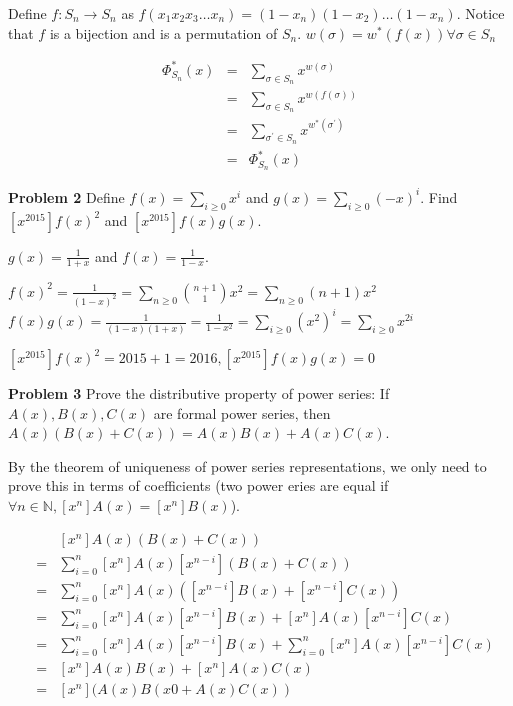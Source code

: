 \documentclass{article}
\newcommand{\func}[3][f]{$#1: #2 \rightarrow #3$}
\begin{document}
\begin{enumerate}[a)]
	Define \func{S_n}{S_n} as $f(x_1x_2x_3 \dots x_n) = (1-x_n)(1-x_2) \dots (1-x_n)$. Notice that $f$ is a bijection and is a permutation of $S_n$. $w(\sigma) = w^*(f(x)) \forall \sigma \in S_n$
	
	\begin{eqnarray*}
		\Phi_{S_n}^*(x) & = & \sum_{\sigma \in S_n}x^{w(\sigma)} \\
		& = & \sum_{\sigma \in S_n}x^{w(f(\sigma))} \\
		& = & \sum_{\sigma^\prime \in S_n}x^{w^*(\sigma^\prime)} \\
		& = & \Phi_{S_n}^*(x)
	\end{eqnarray*}
		
\end{enumerate}

\textbf{Problem 2}
Define $f(x) = \sum_{i \ge 0}x^i$ and $g(x) = \sum_{i \ge 0} (-x)^i$. Find $[x^{2015}]f(x)^2$ and $[x^{2015}]f(x)g(x)$.

$g(x) = \frac{1}{1 + x}$ and $f(x) = \frac{1}{1-x}$. 

$f(x)^2 = \frac{1}{(1-x)^2} = \sum_{n \ge 0} \binom {n+1}1 x^2 = \sum_{n \ge 0} (n+1)x^2$\\
$f(x)g(x) = \frac{1}{(1-x)(1+x)} = \frac{1}{1 - x^2} = \sum_{i \ge 0}(x^2)^i = \sum_{i \ge 0} x ^{2i}$

$[x^{2015}]f(x)^2 = 2015 + 1 = 2016, [x^{2015}]f(x)g(x) = 0$


\textbf{Problem 3}
Prove the distributive property of power series: If $A(x), B(x), C(x)$ are formal power series, then $A(x)(B(x) + C(x)) = A(x)B(x) + A(x)C(x)$.

By the theorem of uniqueness of power series representations, we only need to prove this in terms of coefficients (two power eries are equal if $\forall n \in \mathbb{N}, [x^n]A(x) = [x^n]B(x)$).

\begin{eqnarray*}
	& &[x^n]A(x)(B(x) + C(x))\\
	& = & \sum_{i = 0}^{n} [x^n]A(x)[x^{n-i}](B(x) + C(x))\\
	& = & \sum_{i = 0}^{n} [x^n]A(x)([x^{n-i}]B(x) + [x^{n-i}]C(x))\\
	& = & \sum_{i = 0}^{n} [x^n]A(x)[x^{n-i}]B(x) + [x^n]A(x)[x^{n-i}]C(x)\\
	& = & \sum_{i = 0}^{n} [x^n]A(x)[x^{n-i}]B(x) + \sum_{i = 0}^{n} [x^n]A(x)[x^{n-i}]C(x)\\
	& = & [x^n]A(x)B(x) + [x^n]A(x)C(x) \\
	& = & [x^n](A(x)B(x0 + A(x)C(x))
\end{eqnarray*}
\end{document}
